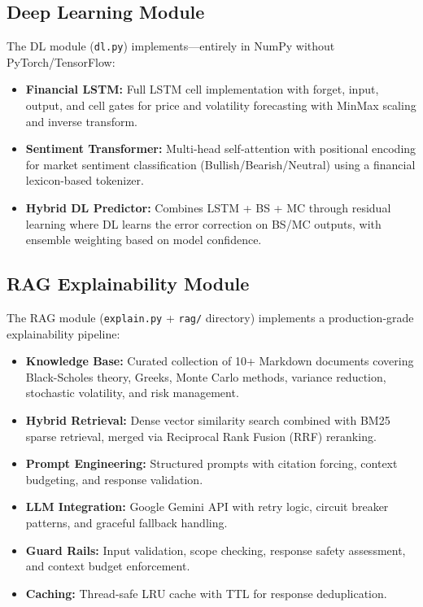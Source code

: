 \documentclass[12pt,a4paper]{report}
\begin{document}
\subsection{Deep Learning Module}

The DL module (\texttt{dl.py}) implements---entirely in NumPy without PyTorch/TensorFlow:

\begin{itemize}
    \item \textbf{Financial LSTM:} Full LSTM cell implementation with forget, input, output, and cell gates for price and volatility forecasting with MinMax scaling and inverse transform.
    \item \textbf{Sentiment Transformer:} Multi-head self-attention with positional encoding for market sentiment classification (Bullish/Bearish/Neutral) using a financial lexicon-based tokenizer.
    \item \textbf{Hybrid DL Predictor:} Combines LSTM + BS + MC through residual learning where DL learns the error correction on BS/MC outputs, with ensemble weighting based on model confidence.
\end{itemize}

\subsection{RAG Explainability Module}

The RAG module (\texttt{explain.py} + \texttt{rag/} directory) implements a production-grade explainability pipeline:

\begin{itemize}
    \item \textbf{Knowledge Base:} Curated collection of 10+ Markdown documents covering Black-Scholes theory, Greeks, Monte Carlo methods, variance reduction, stochastic volatility, and risk management.
    \item \textbf{Hybrid Retrieval:} Dense vector similarity search combined with BM25 sparse retrieval, merged via Reciprocal Rank Fusion (RRF) reranking.
    \item \textbf{Prompt Engineering:} Structured prompts with citation forcing, context budgeting, and response validation.
    \item \textbf{LLM Integration:} Google Gemini API with retry logic, circuit breaker patterns, and graceful fallback handling.
    \item \textbf{Guard Rails:} Input validation, scope checking, response safety assessment, and context budget enforcement.
    \item \textbf{Caching:} Thread-safe LRU cache with TTL for response deduplication.
\end{itemize}
\end{document}
